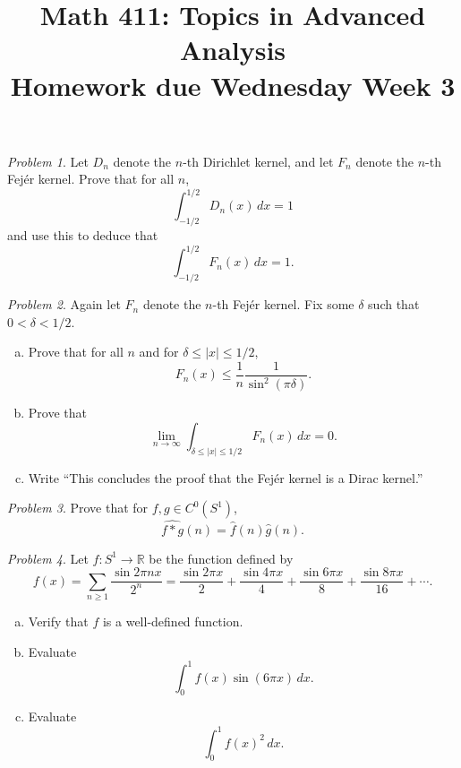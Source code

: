 \documentclass[11pt,twoside]{amsart}
\title{Math 411: Topics in Advanced Analysis\\ Homework due Wednesday Week 3}
\theoremstyle{plain}
\theoremstyle{remark}
\newtheorem{prob}{Problem}
\theoremstyle{definition}
\theoremstyle{definition}
\newcommand{\RR}{\mathbb{R}}
\begin{document}
\maketitle

\begin{prob}
Let $D_n$ denote the $n$-th Dirichlet kernel, and let $F_n$ denote the $n$-th Fej\'er kernel. Prove that for all $n$,
\[
  \int_{-1/2}^{1/2} D_n(x)\,dx = 1
\]
and use this to deduce that
\[
  \int_{-1/2}^{1/2} F_n(x)\,dx = 1.
\]
\end{prob}


\begin{prob}
Again let $F_n$ denote the $n$-th Fej\'er kernel. Fix some $\delta$ such that $0<\delta<1/2$.
\begin{enumerate}[(a)]
\item Prove that for all $n$ and for $\delta\le |x|\le 1/2$,
\[
  F_n(x)\le \frac{1}{n}\frac{1}{\sin^2(\pi\delta)}.
\]
\item Prove that
\[
  \lim_{n\to \infty} \int_{\delta\le |x|\le 1/2}F_n(x)\,dx=0.
\]
\item Write ``This concludes the proof that the Fej\'er kernel is a Dirac kernel.''
\end{enumerate}
\end{prob}


\begin{prob}
Prove that for $f,g\in C^0(S^1)$,
\[
  \widehat{f*g}(n) = \hat f(n)\hat g(n).
\]
\end{prob}


\begin{prob}
Let $f\colon S^1\to \RR$ be the function defined by
\[
  f(x) = \sum_{n\ge 1}\frac{\sin 2\pi nx}{2^n} = \frac{\sin 2\pi x}{2}+\frac{\sin 4\pi x}{4}+\frac{\sin 6\pi x}{8}+\frac{\sin 8\pi x}{16}+\cdots.
\]
\begin{enumerate}[(a)]
\item Verify that $f$ is a well-defined function.
\item Evaluate
\[
  \int_0^1 f(x)\sin(6\pi x)\,dx.
\]
\item Evaluate
\[
  \int_0^1 f(x)^2\,dx.
\]
\end{enumerate}
\end{prob}
\end{document}
